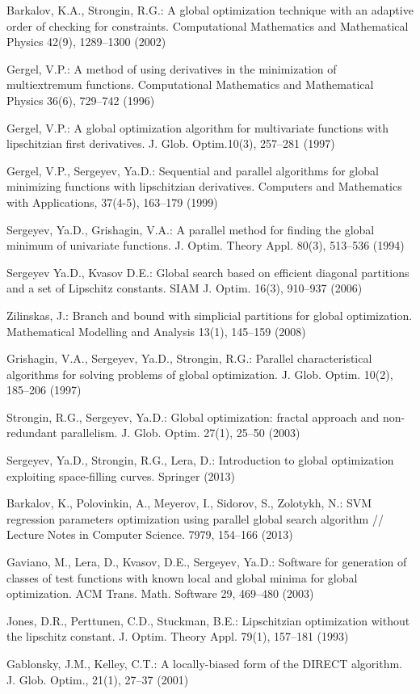 \documentclass[smallcondensed]{svjour3}     %
\begin{document}
\begin{thebibliography}{}
Barkalov, K.A., Strongin, R.G.: A global optimization technique with an adaptive order of checking for constraints. Computational Mathematics and Mathematical Physics 42(9), 1289--1300 (2002)

Gergel, V.P.: A method of using derivatives in the minimization of multiextremum functions. Computational Mathematics and Mathematical Physics 36(6), 729--742 (1996)

Gergel, V.P.: A global optimization algorithm for multivariate functions with lipschitzian first derivatives. J. Glob. Optim.10(3), 257--281 (1997)

Gergel, V.P., Sergeyev, Ya.D.: Sequential and parallel algorithms for global minimizing functions with lipschitzian derivatives. Computers and Mathematics with Applications, 37(4-5), 163--179 (1999)

Sergeyev, Ya.D., Grishagin, V.A.: A parallel method for finding the global minimum of univariate functions. J. Optim. Theory Appl. 80(3), 513--536 (1994)

Sergeyev Ya.D., Kvasov D.E.: Global search based on efficient diagonal partitions and a set of Lipschitz constants. SIAM J. Optim. 16(3), 910--937 (2006)

Zilinskas, J.: Branch and bound with simplicial partitions for global optimization. Mathematical Modelling and Analysis 13(1), 145--159 (2008)

Grishagin, V.A., Sergeyev, Ya.D., Strongin, R.G.: Parallel characteristical algorithms for solving problems of global optimization. J. Glob. Optim. 10(2), 185--206 (1997)

Strongin, R.G., Sergeyev, Ya.D.: Global optimization: fractal approach and non-redundant parallelism. J. Glob. Optim. 27(1), 25--50 (2003)

Sergeyev, Ya.D., Strongin, R.G., Lera, D.: Introduction to global optimization exploiting space-filling curves. Springer (2013)

Barkalov, K., Polovinkin, A., Meyerov, I., Sidorov, S., Zolotykh, N.: SVM regression parameters optimization using parallel global search algorithm // Lecture Notes in Computer Science. 7979, 154--166 (2013)

Gaviano, M., Lera, D., Kvasov, D.E., Sergeyev, Ya.D.: Software for generation of classes of test functions with known local and global minima for global optimization. ACM Trans. Math. Software 29, 469--480 (2003)

Jones, D.R., Perttunen, C.D., Stuckman, B.E.: Lipschitzian optimization without the lipschitz constant. J. Optim. Theory Appl. 79(1), 157--181 (1993)

Gablonsky, J.M., Kelley, C.T.: A locally-biased form of the DIRECT algorithm. J. Glob. Optim., 21(1), 27--37 (2001)


\end{thebibliography}
\end{document}
